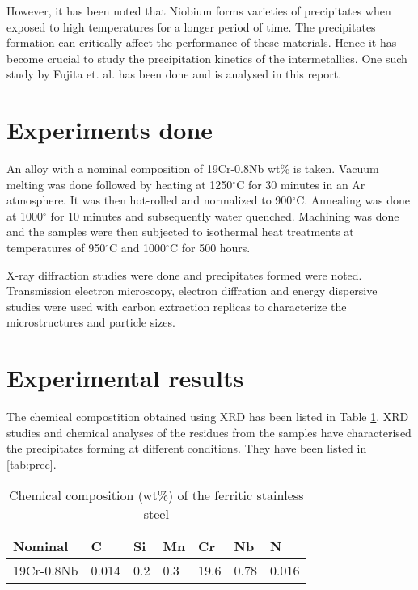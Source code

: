 \documentclass[12pt]{article}
\begin{document}
 However, it has been noted that Niobium forms varieties of precipitates when exposed to high temperatures for a longer period of time. The precipitates formation can critically affect the performance of these materials. Hence it has become crucial to study the precipitation kinetics of the intermetallics. One such study by Fujita et. al. has been done and is analysed in this report.


\section{Experiments done}

 An alloy with a nominal composition of 19Cr-0.8Nb wt\% is taken. Vacuum melting was done followed by heating at 1250$^\circ$C for 30 minutes in an Ar atmosphere. It was then hot-rolled and normalized to 900$^\circ$C. Annealing was done at 1000$^\circ$ for 10 minutes and subsequently water quenched. Machining was done and the samples were then subjected to isothermal heat treatments at temperatures of 950$^\circ$C and 1000$^\circ$C for 500 hours. 

X-ray diffraction studies were done and precipitates formed were noted. Transmission electron microscopy, electron diffration and energy dispersive studies were used with carbon extraction replicas to characterize the microstructures and particle sizes.

\section{Experimental results}

 The chemical compostition obtained using XRD has been listed in Table \ref{tab:nom}. XRD studies and chemical analyses of the residues from the samples have characterised the precipitates forming at different conditions. They have been listed in \ref{tab:prec}.
\begin{table}
\centering
\caption{Chemical composition (wt\%) of the ferritic stainless steel}
\begin{tabular}{ l l l l l l l }
\hline
\hline
Nominal & C & Si & Mn & Cr & Nb & N \\
\hline
19Cr-0.8Nb & 0.014 & 0.2 & 0.3 & 19.6 & 0.78 & 0.016 \\
\hline
\hline
\end{tabular}
\label{tab:nom}
\end{table}
\end{document}
